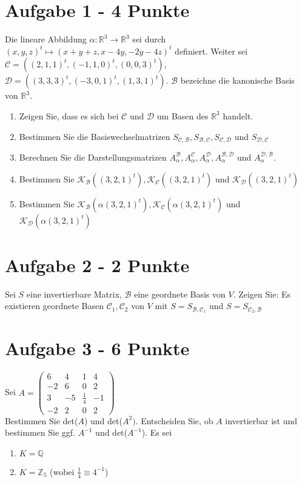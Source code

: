 \section*{Aufgabe 1 - 4 Punkte}
Die lineare Abbildung $\alpha: \mathbb{R}^3 \rightarrow \mathbb{R}^3$ sei durch $(x,y,z)^t \mapsto (x+y+z,x-4y,-2y-4z)^t$ definiert. Weiter sei $\mathcal{C} = ((2,1,1)^t, (-1,1,0)^t,(0,0,3)^t)$, $\mathcal{D} = ((3,3,3)^t,(-3,0,1)^t, (1,3,1)^t)$. $\mathcal{B}$ bezeichne die kanonische Basis von $\mathbb{R}^3$.
\begin{enumerate}[label=\alph*)]
\item Zeigen Sie, dass es sich bei $\mathcal{C}$ und $\mathcal{D}$ um Basen des $\mathbb{R}^3$ handelt.\\
\item Bestimmen Sie die Basiswechselmatrizen $S_{\mathcal{C},\mathcal{B}}, S_{\mathcal{B},\mathcal{C}}, S_{\mathcal{C},\mathcal{D}}$ und $S_{\mathcal{D},\mathcal{C}}$
\item Berechnen Sie die Darstellungsmatrizen $A_{\alpha}^{\mathcal{B}},A_{\alpha}^{\mathcal{C}},A_{\alpha}^{\mathcal{D}},A_{\alpha}^{\mathcal{B},\mathcal{D}}$ und $A_{\alpha}^{\mathcal{D},\mathcal{B}}$.
\item Bestimmen Sie $\mathcal{K}_\mathcal{B} ((3,2,1)^t),\mathcal{K}_\mathcal{C} ((3,2,1)^t)$ und $\mathcal{K}_\mathcal{D} ((3,2,1)^t)$
\item Bestimmen Sie $\mathcal{K}_\mathcal{B} (\alpha(3,2,1)^t),\mathcal{K}_\mathcal{C} (\alpha(3,2,1)^t)$ und $\mathcal{K}_\mathcal{D} (\alpha(3,2,1)^t)$

\end{enumerate}
 

\section*{Aufgabe 2 - 2 Punkte}
Sei $S$ eine invertierbare Matrix, $\mathcal{B}$ eine geordnete Basis von $V$. Zeigen Sie: Es existieren geordnete Basen $\mathcal{C}_1,\mathcal{C}_2$ von $V$ mit $S = S_{\mathcal{B}, \mathcal{C}_{1}}$ und
 $S = S_{ \mathcal{C}_2, \mathcal{B}}$


\section*{Aufgabe 3 - 6 Punkte}
Sei $A = \begin{pmatrix}
6&4&1&4\\
-2&6&0&2\\
3&-5&\frac{1}{4}&-1\\
-2&2&0&2
\end{pmatrix}$\\
Bestimmen Sie det($A$) und det($A^2)$. Entscheiden Sie, ob $A$ invertierbar ist und bestimmen Sie ggf. $A^{-1}$ und det($A^{-1}$). Es sei
\begin{enumerate}[label=\alph*)]
\item $K = \mathbb{Q}$
\item $K = \mathbb{Z}_5$ (wobei $\frac{1}{4} \equiv 4^{-1}$)

\end{enumerate}

